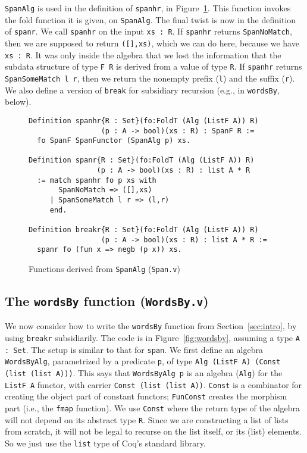 \documentclass[a4paper,USenglish]{lipics-v2021}
\begin{document}
\verb|SpanAlg| is used in the definition of \verb|spanhr|, in
Figure~\ref{fig:span}.  This function invokes the fold function it is
given, on \verb|SpanAlg|.  The final twist is now in the definition of
\verb|spanr|.  We call \verb|spanhr| on the input \verb|xs : R|.  If
\verb|spanhr| returns \verb|SpanNoMatch|, then we are supposed to
return \verb|([],xs)|, which we can do here, because we have
\verb|xs : R|.  It was only inside the algebra that we lost the
information that the subdata structure of type \verb|F R| is derived
from a value of type \verb|R|.  If \verb|spanhr| returns
\verb|SpanSomeMatch l r|, then we return the nonempty
prefix (\verb|l|) and the suffix (\verb|r|).  We also define a version of \verb|break|
for subsidiary recursion (e.g., in \verb|wordsBy|, below).


\begin{figure}
\begin{verbatim}
Definition spanhr{R : Set}(fo:FoldT (Alg (ListF A)) R)
                 (p : A -> bool)(xs : R) : SpanF R :=
  fo SpanF SpanFunctor (SpanAlg p) xs.

Definition spanr{R : Set}(fo:FoldT (Alg (ListF A)) R)
                (p : A -> bool)(xs : R) : list A * R
  := match spanhr fo p xs with
       SpanNoMatch => ([],xs)
     | SpanSomeMatch l r => (l,r)
     end.

Definition breakr{R : Set}(fo:FoldT (Alg (ListF A)) R)
                 (p : A -> bool)(xs : R) : list A * R :=
  spanr fo (fun x => negb (p x)) xs.
\end{verbatim}
\caption{Functions derived from \texttt{SpanAlg} (\texttt{Span.v})}
\label{fig:span}
\end{figure}


\subsection{The \texttt{wordsBy} function (\texttt{WordsBy.v})}
We now consider how to write the \verb|wordsBy| function from
Section~\ref{sec:intro}, by using \verb|breakr| subsidiarily.  The code
is in Figure~\ref{fig:wordsby}, assuming a type \verb|A : Set|.  The
setup is similar to that for \verb|span|.  We first define an algebra
\verb|WordsByAlg|, parametrized by a predicate \verb|p|, of type
\verb|Alg (ListF A) (Const (list (list A)))|.  This says that
\verb|WordsByAlg p| is an algebra (\verb|Alg|) for the \verb|ListF A|
functor, with carrier \verb|Const (list (list A))|.  \verb|Const| is
a combinator for creating the object part of constant functors;
\verb|FunConst| creates the morphism part (i.e., the \verb|fmap|
function).  We use \verb|Const| where the return type of the algebra
will not depend on its abstract type \verb|R|.  Since we are
constructing a list of lists from scratch, it will not be legal to
recurse on the list itself, or its (list) elements.  So we just use
the \verb|list| type of Coq's standard library.
\end{document}
